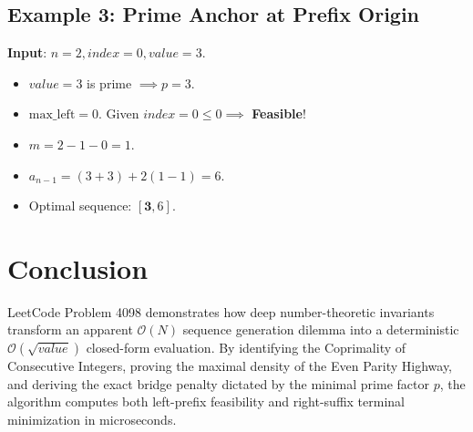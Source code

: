 \documentclass[10pt,journal,compsoc,onecolumn]{IEEEtran}
\begin{document}
\subsection{Example 3: Prime Anchor at Prefix Origin}
\textbf{Input}: $n = 2, index = 0, value = 3$.
\begin{itemize}
    \item $value = 3$ is prime $\implies p = 3$.
    \item $\text{max\_left} = 0$. Given $index = 0 \le 0 \implies$ \textbf{Feasible}!
    \item $m = 2 - 1 - 0 = 1$.
    \item $a_{n-1} = (3 + 3) + 2(1 - 1) = 6$.
    \item Optimal sequence: $[\mathbf{3}, 6]$.
\end{itemize}

\section{Conclusion}
\label{sec:conclusion}

LeetCode Problem 4098 demonstrates how deep number-theoretic invariants transform an apparent $\mathcal{O}(N)$ sequence generation dilemma into a deterministic $\mathcal{O}(\sqrt{value})$ closed-form evaluation. By identifying the Coprimality of Consecutive Integers, proving the maximal density of the Even Parity Highway, and deriving the exact bridge penalty dictated by the minimal prime factor $p$, the algorithm computes both left-prefix feasibility and right-suffix terminal minimization in microseconds.

\end{document}
